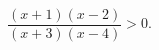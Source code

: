 \begin{ex}[type=inequality]
	\begin{condition}
		$\dfrac{(x + 1)(x - 2)}{(x + 3)(x - 4)}>0 .$
	\end{condition}
\end{ex}